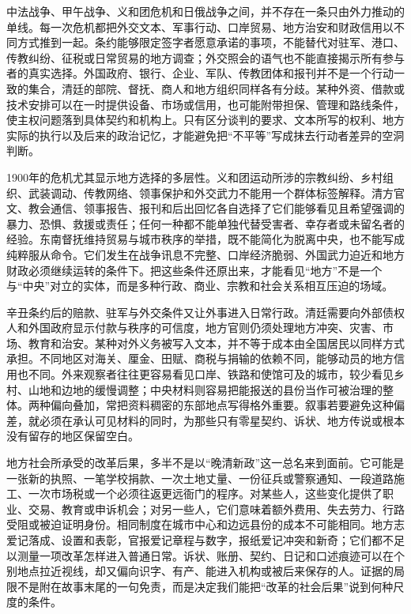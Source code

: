 中法战争、甲午战争、义和团危机和日俄战争之间，并不存在一条只由外力推动的单线。每一次危机都把外交文本、军事行动、口岸贸易、地方治安和财政信用以不同方式推到一起。条约能够限定签字者愿意承诺的事项，不能替代对驻军、港口、传教纠纷、征税或日常贸易的地方调查；外交照会的语气也不能直接揭示所有参与者的真实选择。外国政府、银行、企业、军队、传教团体和报刊并不是一个行动一致的集合，清廷的部院、督抚、商人和地方组织同样各有分歧。某种外资、借款或技术安排可以在一时提供设备、市场或信用，也可能附带担保、管理和路线条件，使主权问题落到具体契约和机构上。只有区分谈判的要求、文本所写的权利、地方实际的执行以及后来的政治记忆，才能避免把“不平等”写成抹去行动者差异的空洞判断。

1900年的危机尤其显示地方选择的多层性。义和团运动所涉的宗教纠纷、乡村组织、武装调动、传教网络、领事保护和外交武力不能用一个群体标签解释。清方官文、教会通信、领事报告、报刊和后出回忆各自选择了它们能够看见且希望强调的暴力、恐惧、救援或责任；任何一种都不能单独代替受害者、幸存者或未留名者的经验。东南督抚维持贸易与城市秩序的举措，既不能简化为脱离中央，也不能写成纯粹服从命令。它们发生在战争讯息不完整、口岸经济脆弱、外国武力迫近和地方财政必须继续运转的条件下。把这些条件还原出来，才能看见“地方”不是一个与“中央”对立的实体，而是多种行政、商业、宗教和社会关系相互压迫的场域。

辛丑条约后的赔款、驻军与外交条件又让外事进入日常行政。清廷需要向外部债权人和外国政府显示付款与秩序的可信度，地方官则仍须处理地方冲突、灾害、市场、教育和治安。某种对外义务被写入文本，并不等于成本由全国居民以同样方式承担。不同地区对海关、厘金、田赋、商税与捐输的依赖不同，能够动员的地方信用也不同。外来观察者往往更容易看见口岸、铁路和使馆可及的城市，较少看见乡村、山地和边地的缓慢调整；中央材料则容易把能报送的县份当作可被治理的整体。两种偏向叠加，常把资料稠密的东部地点写得格外重要。叙事若要避免这种偏差，就必须在承认可见材料的同时，为那些只有零星契约、诉状、地方传说或根本没有留存的地区保留空白。

地方社会所承受的改革后果，多半不是以“晚清新政”这一总名来到面前。它可能是一张新的执照、一笔学校捐款、一次土地丈量、一份征兵或警察通知、一段道路施工、一次市场税或一个必须往返更远衙门的程序。对某些人，这些变化提供了职业、交易、教育或申诉机会；对另一些人，它们意味着额外费用、失去劳力、行路受阻或被迫证明身份。相同制度在城市中心和边远县份的成本不可能相同。地方志爱记落成、设置和表彰，官报爱记章程与数字，报纸爱记冲突和新奇；它们都不足以测量一项改革怎样进入普通日常。诉状、账册、契约、日记和口述痕迹可以在个别地点拉近视线，却又偏向识字、有产、能进入机构或被后来保存的人。证据的局限不是附在故事末尾的一句免责，而是决定我们能把“改革的社会后果”说到何种尺度的条件。

